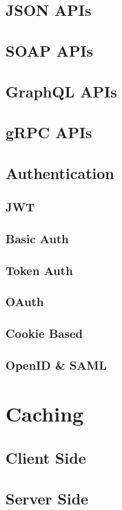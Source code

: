 \documentclass[a4paper]{article}
\begin{document}
    \subsection{JSON APIs}
    \subsection{SOAP APIs}
    \subsection{GraphQL APIs}
    \subsection{gRPC APIs}
    
    \subsection{Authentication}
    \subsubsection{JWT}
    \subsubsection{Basic Auth}
    \subsubsection{Token Auth}
    \subsubsection{OAuth}
    \subsubsection{Cookie Based}
    \subsubsection{OpenID \& SAML}

    

    \newpage
    \section{Caching}
    \subsection{Client Side}
    \subsection{Server Side}
\end{document}
